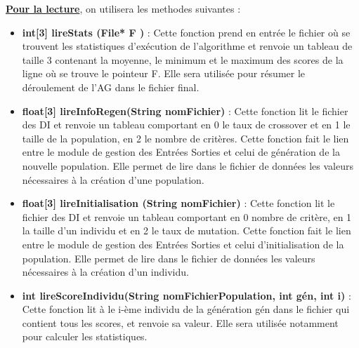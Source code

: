 \documentclass[a4paper,11pt]{article}
\begin{document}
\begin{itemize}
			\end{itemize}
			
			\underline{\bf Pour la lecture}, on utilisera les methodes suivantes :\\
			\begin{itemize}
				\item \textbf{int[3] lireStats (File* F )} : Cette fonction prend en entrée le fichier où se trouvent les statistiques d’exécution de l’algorithme et renvoie un tableau de taille 3 contenant la moyenne, le minimum et le maximum des scores de la ligne où se trouve le pointeur F. Elle sera utilisée pour résumer le déroulement de l'AG dans le fichier final.\vspace{0.2cm}
				\item \textbf{float[3] lireInfoRegen(String nomFichier)} : Cette fonction lit le fichier des DI et renvoie un tableau comportant en 0 le taux de crossover et en 1 le taille de la population, en 2 le nombre de critères.
					Cette fonction fait le lien entre le module de gestion des Entrées Sorties et celui de génération de la nouvelle population.
					Elle permet de lire dans le fichier de données les valeurs nécessaires à la création d’une population.\vspace{0.2cm}
				\item \textbf{float[3] lireInitialisation (String nomFichier)} : Cette fonction lit le fichier des DI et renvoie un tableau comportant en 0 nombre de critère, en 1 la taille d’un individu et en 2 le taux de mutation. Cette fonction fait le lien entre le module de gestion des Entrées Sorties et celui d’initialisation de la population. 
					Elle permet de lire dans le fichier de données les valeurs nécessaires à la création d’un individu.\vspace{0.2cm}

				\item \textbf{int lireScoreIndividu(String nomFichierPopulation, int gén, int i)} : Cette fonction lit à le i-ème individu de la génération gén dans le fichier qui contient tous les scores, et renvoie sa valeur. Elle sera utilisée notamment pour calculer les statistiques.\\

			\end{itemize}
			
\end{document}
